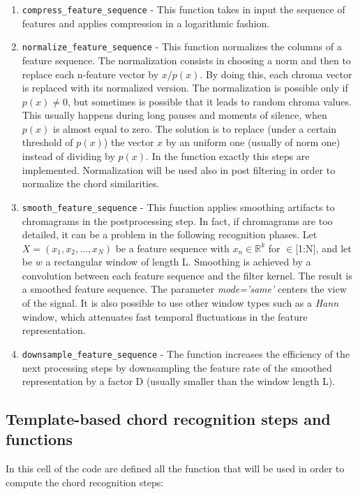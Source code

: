 \documentclass{article}
\begin{document}
\begin{enumerate}
	\item \verb|compress_feature_sequence| - This function takes in input the sequence of features and applies compression in a logarithmic fashion.
	\item \verb|normalize_feature_sequence| - This function normalizes the columns of a feature sequence. The  normalization consists in choosing a norm and then to replace each n-feature vector  by $x/p(x)$. By doing this, each chroma vector is replaced with its normalized version.  The normalization is possible only if $p(x)\neq0$, but sometimes is possible that it leads to random chroma values. This usually happens during long pauses and moments of silence, when $p(x)$ is almost equal to zero. The solution is to replace (under a certain threshold of $p(x)$) the vector $x$  by an uniform one (usually of norm one) instead of dividing by $p(x)$. In the function exactly this steps are implemented. Normalization will be used also in post filtering in order to normalize the chord similarities.
	\item \verb|smooth_feature_sequence| -  This function applies smoothing artifacts to chromagrams in the postprocessing step. In fact, if chromagrams are too detailed, it can be a problem in the following recognition phases. Let \(X=(x_1,x_2,...,x_N)\) be a feature sequence with $x_n \in \mathbb{R}^k$ for $\in$[1:N], and let be $w$ a rectangular window  of length L. Smoothing is achieved by a convolution between each feature sequence and the filter kernel. The result is a smoothed feature sequence. 
	The parameter \textit{mode='same'} centers the view of the signal. It is also possible to use other window types such as a \textit{Hann }window, which attenuates fast temporal fluctuations in the feature representation.
	\item \verb|downsample_feature_sequence| - The function increases the efficiency of the next processing steps by downsampling the feature rate of the smoothed representation by a factor D (usually smaller than the window length L).  
\end{enumerate}

\subsection*{Template-based chord recognition steps and functions}

In this cell of the code are defined all the function that will be used in order to compute the chord recognition steps:
\end{document}

